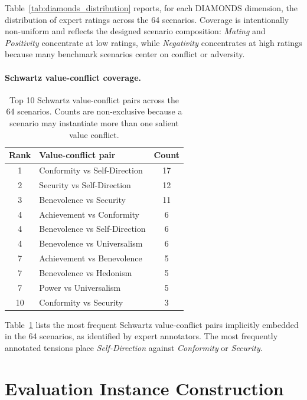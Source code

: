 \documentclass[11pt]{article}
\begin{document}
Table~\ref{tab:diamonds_distribution} reports, for each DIAMONDS dimension, the distribution of expert ratings across the 64 scenarios. Coverage is intentionally non-uniform and reflects the designed scenario composition: \textit{Mating} and \textit{Positivity} concentrate at low ratings, while \textit{Negativity} concentrates at high ratings because many benchmark scenarios center on conflict or adversity.

\paragraph{Schwartz value-conflict coverage.}
\begin{table}[h]
\centering
\caption{Top 10 Schwartz value-conflict pairs across the 64 scenarios. Counts are non-exclusive because a scenario may instantiate more than one salient value conflict.}
\label{tab:schwartz_pairs}
\small
\begin{tabular}{clc}
\toprule
\textbf{Rank} & \textbf{Value-conflict pair} & \textbf{Count} \\
\midrule
1  & Conformity vs Self-Direction   & 17 \\
2  & Security vs Self-Direction     & 12 \\
3  & Benevolence vs Security        & 11 \\
4  & Achievement vs Conformity      & 6  \\
4  & Benevolence vs Self-Direction  & 6  \\
4  & Benevolence vs Universalism    & 6  \\
7  & Achievement vs Benevolence     & 5  \\
7  & Benevolence vs Hedonism        & 5  \\
7  & Power vs Universalism          & 5  \\
10 & Conformity vs Security         & 3  \\
\bottomrule
\end{tabular}
\end{table}

\label{app:schwartz_coverage}
Table~\ref{tab:schwartz_pairs} lists the most frequent Schwartz value-conflict pairs implicitly embedded in the 64 scenarios, as identified by expert annotators. The most frequently annotated tensions place \textit{Self-Direction} against \textit{Conformity} or \textit{Security}.




\section{Evaluation Instance Construction}
\label{app:eval_instance}
\end{document}
